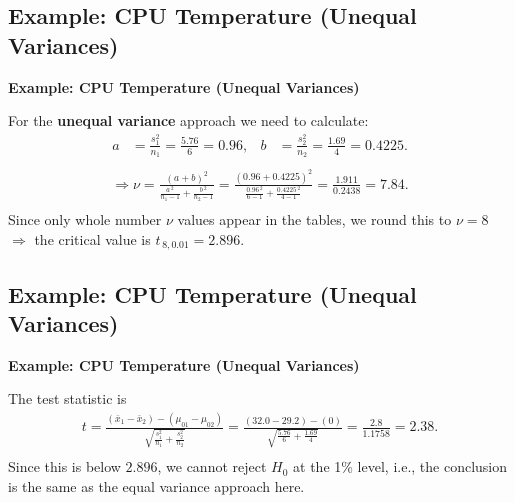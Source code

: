 \documentclass[compress]{beamer}        %
\makeatletter
\newcommand{\tcb}{\textcolor{beamer@blendedblue}}
\makeatother
\begin{document}
\subsection{Example: CPU Temperature (Unequal Variances)}
\begin{frame}{\bf \tcb{Example: CPU Temperature (Unequal Variances)}}

For the {\bf unequal variance} approach we need to calculate:\\
\begin{align*}
a &= \frac{s_1^2}{n_1} = \frac{5.76}{6} = 0.96, &
b &= \frac{s_2^2}{n_2} = \frac{1.69}{4} = 0.4225.\\[-0.5cm]
\end{align*}
\begin{align*}
\Rightarrow \nu = \frac{(a+b)^2}{\frac{a\,^2}{n_1-1}+\frac{b\,^2}{n_2-1}} = \frac{(0.96+0.4225)^2}{\frac{0.96\,^2}{6-1}+\frac{0.4225\,^2}{4-1}}
= \frac{1.911}{0.2438} = 7.84.\\
\end{align*}
Since only whole number $\nu$ values appear in the tables, we round this to $\nu = 8$ $\Rightarrow$ the critical value is $t_{\,8,0.01} = 2.896$.

\end{frame}





\subsection{Example: CPU Temperature (Unequal Variances)}
\begin{frame}{\bf \tcb{Example: CPU Temperature (Unequal Variances)}}

The test statistic is\\[0.2cm]
\begin{align*}
t=\frac{(\bar x_1 - \bar x_2)-(\mu_{01}-\mu_{02})}{\sqrt{\frac{s_1^2}{n_1}+\frac{s_2^2}{n_2}}}=
\frac{(32.0 - 29.2)-(0)}{\sqrt{\frac{5.76}{6}+\frac{1.69}{4}}} = \frac{2.8}{1.1758} = 2.38.\\
\end{align*}
Since this is below $2.896$, we cannot reject $H_0$ at the 1\% level, i.e., the conclusion is the same as the equal variance approach here.\\[0.6cm]


\end{frame}
\end{document}
